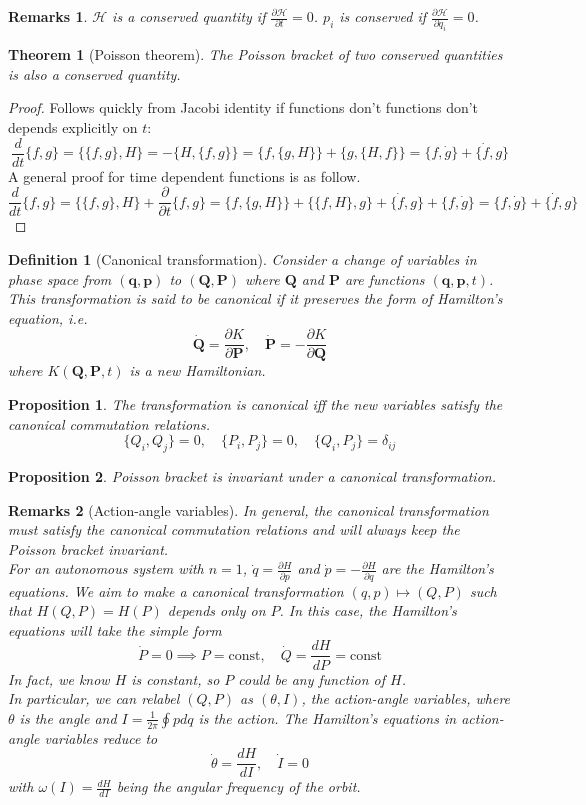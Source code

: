 \documentclass[a4paper]{article}
\newtheorem{defi}{Definition}[section]
\newtheorem{remarks}{Remarks}[section]
\newtheorem{thm}{Theorem}[section]
\newtheorem{prop}{Proposition}[section]
\theoremstyle{new}
\begin{document}
\begin{remarks}
$\mathcal{H}$ is a conserved quantity if $\frac{\partial\mathcal{H}}{\partial t}=0$. $p_i$ is conserved if $\frac{\partial\mathcal{H}}{\partial q_i}=0$.
\end{remarks}
\begin{thm}[Poisson theorem]
The Poisson bracket of two conserved quantities is also a conserved quantity.
\end{thm}
\begin{proof}
Follows quickly from Jacobi identity if functions don’t functions don’t depends explicitly on $t$:
$$\frac{d}{dt}\{f,g\}=\{\{f,g\},H\}=-\{H,\{f,g\}\}=\{f,\{g,H\}\}+\{g,\{H,f\}\}=\{f,\dot{g}\}+\{\dot{f},g\}$$
A general proof for time dependent functions is as follow.
$$\frac{d}{dt}\{f, g\} =\{\{f, g\}, H\} +\frac{\partial}{\partial t}\{f, g\}=\{f, \{g, H\}\} + \{\{f, H\}, g\} + \{\dot{f},g\}+\{f, \dot{g}\}=\{f,\dot{g}\}+\{\dot{f},g\}$$
\end{proof}
\begin{defi}[Canonical transformation]
Consider a change of variables in phase space from $(\mathbf{q},\mathbf{p})$ to $(\mathbf{Q},\mathbf{P})$ where $\mathbf{Q}$ and $\mathbf{P}$ are functions $(\mathbf{q},\mathbf{p}, t)$. This transformation is said to be canonical if it preserves the form of Hamilton’s equation, i.e.
$$\mathbf{\dot{Q}}=\frac{\partial K}{\partial\mathbf{P}},\quad\mathbf{\dot{P}}=-\frac{\partial K}{\partial\mathbf{Q}}$$
where $K(\mathbf{Q},\mathbf{P},t)$ is a new Hamiltonian.
\end{defi}
\begin{prop}
 The transformation is canonical iff the new variables satisfy the canonical commutation relations.
 $$\{Q_i,Q_j\}=0,\quad\{P_i,P_j\}=0,\quad\{Q_i,P_j\}=\delta_{ij}$$
\end{prop}
\begin{prop}
Poisson bracket is invariant under a canonical transformation.
\end{prop}
\begin{remarks}[Action-angle variables]
In general, the canonical transformation must satisfy the canonical commutation relations and will always keep the Poisson bracket invariant.\\[5pt]
For an autonomous system with $n=1$, $\dot{q}=\frac{\partial H}{\partial p}$ and $\dot{p}=-\frac{\partial H}{\partial q}$ are the Hamilton's equations. We aim to make a canonical transformation $(q,p)\mapsto(Q,P)$ such that $H(Q,P)=H(P)$ depends only on $P$. In this case, the Hamilton's equations will take the simple form
$$\dot{P}=0\implies P=\text{const},\quad\dot{Q}=\frac{dH}{dP}=\text{const}$$
In fact, we know $H$ is constant, so $P$ could be any function of $H$.\\[5pt]
In particular, we can relabel $(Q,P)$ as $(\theta,I)$, the action-angle variables, where $\theta$ is the angle and $I=\frac{1}{2\pi}\oint pdq$ is the action. The Hamilton's equations in action-angle variables reduce to 
$$\dot{\theta}=\frac{dH}{dI},\quad\dot{I}=0$$
with $\omega(I)=\frac{dH}{dI}$ being the angular frequency of the orbit.
\end{remarks}
\end{document}
